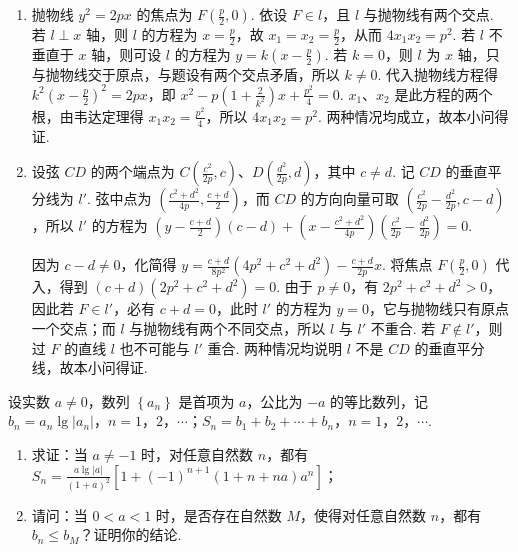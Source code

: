 \documentclass[UTF8,a4paper,oneside,11pt]{ctexbook}
\begin{document}
\begin{solution}

\begin{enumerate}
\item 抛物线 \(y^{2}=2px\) 的焦点为 \(F\left(\frac{p}{2},0\right)\). 依设 \(F\in l\)，且 \(l\) 与抛物线有两个交点. 若 \(l\perp x\) 轴，则 \(l\) 的方程为 \(x=\frac{p}{2}\)，故 \(x_{1}=x_{2}=\frac{p}{2}\)，从而 \(4x_{1}x_{2}=p^{2}\). 若 \(l\) 不垂直于 \(x\) 轴，则可设 \(l\) 的方程为 \(y=k\left(x-\frac{p}{2}\right)\). 若 \(k=0\)，则 \(l\) 为 \(x\) 轴，只与抛物线交于原点，与题设有两个交点矛盾，所以 \(k\neq0\). 代入抛物线方程得 \(k^{2}\left(x-\frac{p}{2}\right)^{2}=2px\)，即 \(x^{2}-p\left(1+\frac{2}{k^{2}}\right)x+\frac{p^{2}}{4}=0\). \(x_{1}\)、\(x_{2}\) 是此方程的两个根，由韦达定理得 \(x_{1}x_{2}=\frac{p^{2}}{4}\)，所以 \(4x_{1}x_{2}=p^{2}\). 两种情况均成立，故本小问得证.

\item 设弦 \(CD\) 的两个端点为 \(C\left(\frac{c^{2}}{2p},c\right)\)、\(D\left(\frac{d^{2}}{2p},d\right)\)，其中 \(c\neq d\). 记 \(CD\) 的垂直平分线为 \(l'\). 弦中点为 \(\left(\frac{c^{2}+d^{2}}{4p},\frac{c+d}{2}\right)\)，而 \(CD\) 的方向向量可取 \(\left(\frac{c^{2}}{2p}-\frac{d^{2}}{2p},c-d\right)\)，所以 \(l'\) 的方程为
\(\left(y-\frac{c+d}{2}\right)(c-d)+\left(x-\frac{c^{2}+d^{2}}{4p}\right)\left(\frac{c^{2}}{2p}-\frac{d^{2}}{2p}\right)=0\).

因为 \(c-d\neq0\)，化简得 \(y=\frac{c+d}{8p^{2}}\left(4p^{2}+c^{2}+d^{2}\right)-\frac{c+d}{2p}x\). 将焦点 \(F\left(\frac{p}{2},0\right)\) 代入，得到 \((c+d)(2p^{2}+c^{2}+d^{2})=0\). 由于 \(p\neq0\)，有 \(2p^{2}+c^{2}+d^{2}>0\)，因此若 \(F\in l'\)，必有 \(c+d=0\)，此时 \(l'\) 的方程为 \(y=0\)，它与抛物线只有原点一个交点；而 \(l\) 与抛物线有两个不同交点，所以 \(l\) 与 \(l'\) 不重合. 若 \(F\notin l'\)，则过 \(F\) 的直线 \(l\) 也不可能与 \(l'\) 重合. 两种情况均说明 \(l\) 不是 \(CD\) 的垂直平分线，故本小问得证.
\end{enumerate}

\end{solution}

\begin{problem}

设实数 \(a \neq 0\)，数列 \(\left\{a_n\right\}\) 是首项为 \(a\)，公比为 \(-a\) 的等比数列，记 \(b_n = a_n \lg \left|a_n\right|\)，\(n = 1\)，\(2\)，\(\cdots\)；\(S_n = b_1 + b_2 + \cdots + b_n\)，\(n = 1\)，\(2\)，\(\cdots\).

\begin{enumerate}
\item 求证：当 \(a \neq -1\) 时，对任意自然数 \(n\)，都有 \(S_{n} = \frac{a \lg |a|}{(1 + a)^{2}} \left[ 1 + (-1)^{n+1} (1 + n + na) a^{n} \right]\)；
\item 请问：当 \(0<a<1\) 时，是否存在自然数 \(M\)，使得对任意自然数 \(n\)，都有 \(b_{n}\leqslant b_{M}\)？证明你的结论.
\end{enumerate}
\end{problem}
\end{document}
